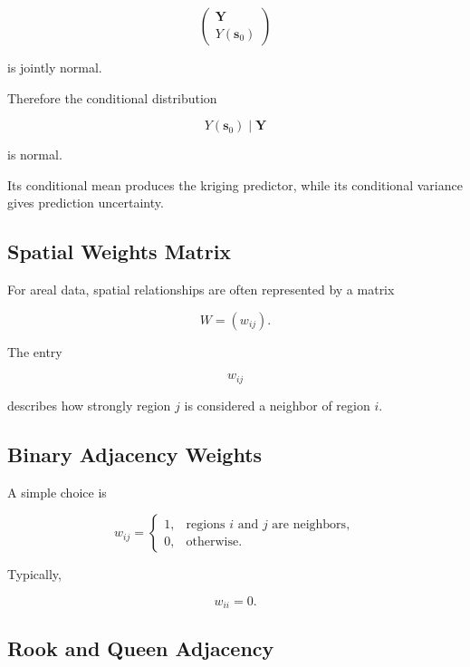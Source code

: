 \[
\begin{pmatrix}
\mathbf{Y}\\
Y(\mathbf{s}_0)
\end{pmatrix}
\]

is jointly normal.

Therefore the conditional distribution

\[
\boxed{
Y(\mathbf{s}_0)
\mid
\mathbf{Y}
}
\]

is normal.

Its conditional mean produces the kriging predictor, while its
conditional variance gives prediction uncertainty.

\subsection{Spatial Weights Matrix}
\label{subsec:spatial-weights-matrix}

For areal data, spatial relationships are often represented by a matrix

\[
\boxed{
W=(w_{ij}).
}
\]

The entry

\[
w_{ij}
\]

describes how strongly region \(j\) is considered a neighbor of region
\(i\).

\subsection{Binary Adjacency Weights}
\label{subsec:binary-adjacency-weights}

A simple choice is

\[
\boxed{
w_{ij}
=
\begin{cases}
1,
&
\text{regions }i\text{ and }j\text{ are neighbors},
\\
0,
&
\text{otherwise}.
\end{cases}
}
\]

Typically,

\[
\boxed{
w_{ii}=0.
}
\]

\subsection{Rook and Queen Adjacency}
\label{subsec:rook-queen-adjacency}

